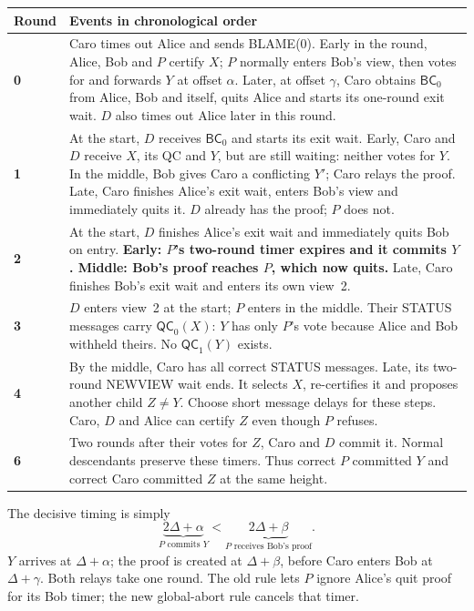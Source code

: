 \documentclass[10pt,a4paper]{article}
\newcommand{\QC}{\mathsf{QC}}
\newcommand{\BC}{\mathsf{BC}}
\begin{document}
\begin{tabularx}{\linewidth}{@{}>{\raggedright\arraybackslash}p{.16\linewidth}Y@{}}
\toprule
Round & Events in chronological order\\\midrule
\textbf{0} & Caro times out Alice and sends BLAME(0). Early in the round,
Alice, Bob and $P$ certify $X$; $P$ normally enters Bob's view, then votes
for and forwards $Y$ at offset $\alpha$. Later, at offset $\gamma$, Caro
obtains $\BC_0$ from Alice, Bob and itself, quits Alice and starts its
one-round exit wait. $D$ also times out Alice later in this round.\\
\textbf{1} & At the start, $D$ receives $\BC_0$ and starts its exit wait.
Early, Caro and $D$ receive $X$, its QC and $Y$, but are still waiting:
neither votes for $Y$. In the middle, Bob gives Caro a conflicting $Y'$;
Caro relays the proof. Late, Caro finishes Alice's exit wait, enters Bob's
view and immediately quits it. $D$ already has the proof; $P$ does not.\\
\textbf{2} & At the start, $D$ finishes Alice's exit wait and immediately
quits Bob on entry. \textbf{Early: $P$'s two-round timer expires and it
commits $Y$. Middle: Bob's proof reaches $P$, which now quits.}
Late, Caro finishes Bob's exit wait and enters its own view~2.\\
\textbf{3} & $D$ enters view~2 at the start; $P$ enters in the middle.
Their STATUS messages carry $\QC_0(X)$: $Y$ has only $P$'s vote because
Alice and Bob withheld theirs. No $\QC_1(Y)$ exists.\\
\textbf{4} & By the middle, Caro has all correct STATUS messages. Late,
its two-round NEWVIEW wait ends. It selects $X$, re-certifies it and
proposes another child $Z\ne Y$. Choose short message delays for these
steps. Caro, $D$ and Alice can certify $Z$ even though $P$ refuses.\\
\textbf{6} & Two rounds after their votes for $Z$, Caro and $D$ commit it.
Normal descendants preserve these timers. Thus correct $P$ committed $Y$
and correct Caro committed $Z$ at the same height.\\\bottomrule
\end{tabularx}

The decisive timing is simply
\[
 \underbrace{2\Delta+\alpha}_{P\text{ commits }Y}
 <\underbrace{2\Delta+\beta}_{P\text{ receives Bob's proof}}.
\]
$Y$ arrives at $\Delta+\alpha$; the proof is created at $\Delta+\beta$,
before Caro enters Bob at $\Delta+\gamma$. Both relays take one round.
The old rule lets $P$ ignore Alice's quit proof for its Bob timer; the new
global-abort rule cancels that timer.
\end{document}
